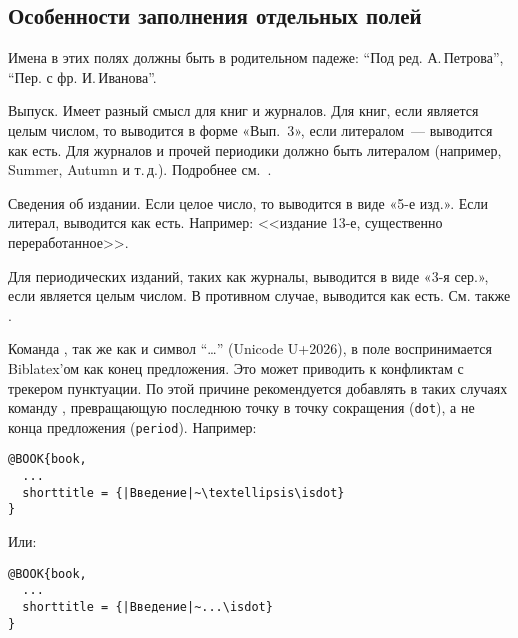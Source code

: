 \documentclass[11pt,a4paper,headings=small,numbers=enddot]{ltxdockit}[2011/03/25]
\newcommand*{\biblatex}{Biblatex\xspace}
\begin{document}
\subsection{Особенности заполнения отдельных полей}
\label{sec:filling}

\begin{fieldlist}


Имена в этих полях 
должны быть в 
родительном падеже: 
\enquote{Под ред.  А.\,Петрова}, \enquote{Пер. с фр.  И.\,Иванова}.


Выпуск. Имеет разный смысл для книг и журналов. Для книг, если является 
целым числом, то выводится в форме «Вып.~3», если литералом~--- выводится как есть.
Для журналов и 
прочей периодики должно быть литералом (например, Summer, Autumn и т.\,д.).
Подробнее см.~.


Сведения об издании. Если целое число, то выводится в виде «5-е изд.». Если литерал, выводится как есть. Например: <<издание 13-е, существенно переработанное>>.


Для периодических изданий, таких как журналы, выводится в виде «3-я сер.», если
является целым числом. В противном случае, выводится как есть. См. также .

\label{ellipsis}

Команда , так же как и символ \enquote{…} (Unicode U+2026), в поле  воспринимается \biblatex'ом
как конец предложения. Это может приводить к конфликтам с трекером пунктуации. 
По этой причине рекомендуется добавлять в таких случаях
команду , превращающую
последнюю точку в точку сокращения (\texttt{dot}), а не конца предложения 
(\texttt{period}). Например: 

\begin{lstlisting}[style=bibtex,escapechar=|]
@BOOK{book,
  ...
  shorttitle = {|Введение|~\textellipsis\isdot}
}
\end{lstlisting}

Или:

\begin{lstlisting}[style=bibtex,escapechar=|]
@BOOK{book,
  ...
  shorttitle = {|Введение|~...\isdot}
}
\end{lstlisting}


   
\end{fieldlist}
\end{document}
